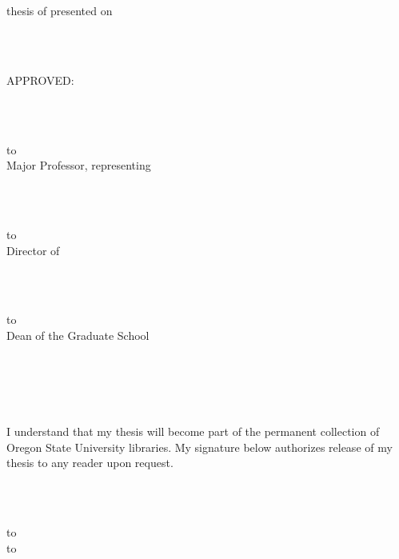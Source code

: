 \thispagestyle{empty}
{\baselineskip=14.5pt
\def\ruleline{\hbox to \hsize{\hrulefill}\\[-2ex]}
\noindent
\underline{\phantom{,}\mydegree\phantom{,}} thesis of
\underline{\phantom{,}\myname\phantom{,}} presented on
\underline{\phantom{,}\myday\phantom{,}}
\strut\\
\strut\\
APPROVED:\\
\strut\\[-0mm]
\strut\\
\ruleline
Major Professor, representing \mymajor\\
\strut\\[-0mm]
\strut\\
\ruleline
Director of \mydepart\\ 
\strut\\[-0mm]
\strut\\
\ruleline
Dean of the Graduate School\\
\strut\\[-0mm]
\strut\\
\strut\\
I understand that my thesis will become part of the permanent collection of
Oregon State University libraries.  My signature below authorizes release of
my thesis to any reader upon request.
\strut\\[-0mm]
\strut\\
\ruleline
\hbox to \textwidth{\hfil \myname, Author \hfil}
}


 

